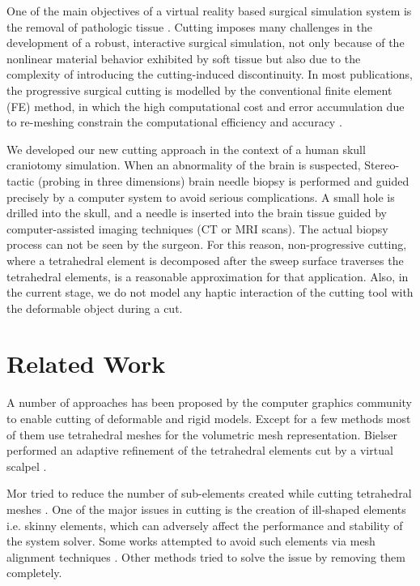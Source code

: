 \label{chapter:Cutting}
One of the main objectives of a virtual reality based surgical simulation system is the removal of pathologic tissue 
\cite{Steinemann, Nienhuys2001a}. Cutting imposes many challenges in the development of a robust, interactive surgical 
simulation, not only because of the nonlinear material behavior exhibited by soft tissue but also due to the
complexity of introducing the cutting-induced discontinuity. In most publications, the progressive surgical cutting is modelled
by the conventional finite element (FE) method, in which the high computational cost and error accumulation due to re-meshing constrain 
the computational efficiency and accuracy \cite{Steinemann, Courtecuisse2010a}. 

We developed our new cutting approach in the context of a human skull craniotomy simulation. When an abnormality of the brain is suspected, 
Stereo-tactic (probing in three dimensions) brain needle biopsy is performed and guided precisely by a computer system to avoid 
serious complications. A small hole is drilled into the skull, and a needle is inserted into the brain tissue guided by computer-assisted 
imaging techniques (CT or MRI scans). The actual biopsy process can not be seen by the surgeon. For this reason,
non-progressive cutting, where a tetrahedral element is decomposed after the sweep surface traverses the tetrahedral elements, is a reasonable
approximation for that application. Also, in the current stage, we do not model any haptic interaction of the cutting tool with the 
deformable object during a cut. 


\section{Related Work}
A number of approaches has been proposed by the computer graphics community to enable cutting of deformable and rigid models. 
Except for a few methods most of them use tetrahedral meshes for the volumetric mesh representation. 
Bielser \etal performed an adaptive refinement of the tetrahedral elements cut by a virtual scalpel \cite{Bielser1999}.

Mor \etal tried to reduce the number of sub-elements created while cutting tetrahedral meshes \cite{Mor2000}.
One of the major issues in cutting is the creation of ill-shaped elements i.e. skinny elements, which can adversely affect the
performance and stability of the system solver. Some works attempted to avoid such elements via mesh alignment techniques 
\cite{Nienhuys2001a, Steinemann2006}. Other methods tried to solve the issue by removing them completely.

